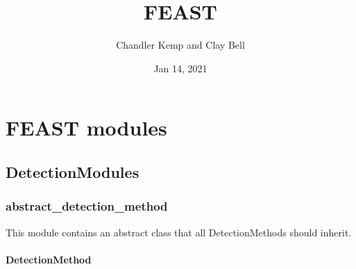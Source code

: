 \documentclass[letterpaper,10pt,english]{sphinxmanual}
\title{FEAST}
\date{Jan 14, 2021}
\author{Chandler Kemp and Clay Bell}
\begin{document}
\pagestyle{empty}
\sphinxmaketitle
\pagestyle{plain}
\sphinxtableofcontents
\pagestyle{normal}
\label{\detokenize{index::doc}}

\begin{quote}
\end{quote}


\chapter{FEAST modules}
\label{\detokenize{index:feast-modules}}

\section{DetectionModules}
\label{\detokenize{index:detectionmodules}}

\subsection{abstract\_detection\_method}
\label{\detokenize{index:module-feast.DetectionModules.abstract_detection_method}}\label{\detokenize{index:abstract-detection-method}}
This module contains an abstract class that all DetectionMethods should inherit.


\subsubsection{DetectionMethod}
\label{\detokenize{index:detectionmethod}}
\end{document}
